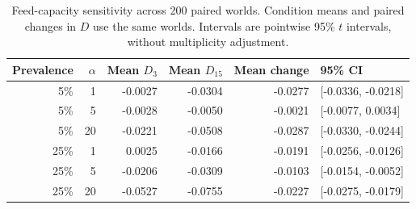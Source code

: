 \begin{table}[!htbp]
\caption{Feed-capacity sensitivity across 200 paired worlds. Condition means and paired changes in $D$ use the same worlds. Intervals are pointwise 95\% $t$ intervals, without multiplicity adjustment.}
\label{tab:feed-capacity}
\centering\small
\begin{tabular}{rrrrrl}
\hline
Prevalence & $\alpha$ & Mean $D_3$ & Mean $D_{15}$ & Mean change & 95\% CI \\
\hline
5\% & 1 & -0.0027 & -0.0304 & -0.0277 & [-0.0336, -0.0218] \\
5\% & 5 & -0.0028 & -0.0050 & -0.0021 & [-0.0077, 0.0034] \\
5\% & 20 & -0.0221 & -0.0508 & -0.0287 & [-0.0330, -0.0244] \\
25\% & 1 & 0.0025 & -0.0166 & -0.0191 & [-0.0256, -0.0126] \\
25\% & 5 & -0.0206 & -0.0309 & -0.0103 & [-0.0154, -0.0052] \\
25\% & 20 & -0.0527 & -0.0755 & -0.0227 & [-0.0275, -0.0179] \\
\hline
\end{tabular}
\end{table}
